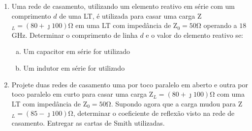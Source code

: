 \begin{enumerate}[1.]
\item Uma rede de casamento, utilizando um elemento reativo em série com um comprimento $d$ de uma LT, é utilizada para casar uma carga Z$_{L} = (80 + \jmath 100)$\si{\ohm} em uma LT com impedância de Z$_{0} = 50$\si{\ohm} operando a $18$\si{\giga\hertz}. Determinar o comprimento de linha $d$ e o valor do elemento reativo se:
\begin{enumerate}[a.]
  \setlength\itemindent{15pt} \item Um capacitor em série for utilizado
  \setlength\itemindent{15pt} \item Um indutor em série for utilizado
\end{enumerate}
\item Projete duas redes de casamento uma por toco paralelo em aberto e outra por toco paralelo em curto para casar uma carga Z$_{L} = (80 + \jmath 100)$\si{\ohm} com uma LT com impedância de Z$_{0} = 50$\si{\ohm}. Supondo agora que a carga mudou para Z$_{L} = (85 - \jmath 100)$\si{\ohm}, determinar o coeficiente de reflexão visto na rede de casamento. Entregar as cartas de Smith utilizadas.
\end{enumerate}

\newpage

\begin{center}\end{center}


\vspace*{1.5cm}

